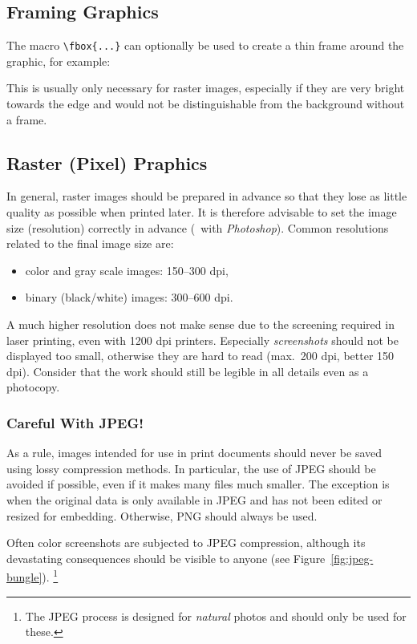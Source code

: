 \subsection{Framing Graphics}

The macro \verb!\fbox{...}! can optionally be used to create a thin frame
around the graphic, for example:
%
\begin{GenericCode}[numbers=none]
\end{GenericCode}
%
This is usually only necessary for raster images, especially if they are very
bright towards the edge and would not be distinguishable from the background
without a frame.

\subsection{Raster (Pixel) Praphics}

In general, raster images should be prepared in advance so that they lose as
little quality as possible when printed later. It is therefore advisable to
set the image size (resolution) correctly in advance (\eg\ with
\emph{Photoshop}). Common resolutions related to the final image size are:
%
\begin{itemize}
    \item color and gray scale images: 150--300 dpi,
    \item binary (black/white) images: 300--600 dpi.
\end{itemize}
%
A much higher resolution does not make sense due to the screening required in
laser printing, even with 1200 dpi printers. Especially \emph{screen\-shots}
should not be displayed too small, otherwise they are hard to read (max.\ 200
dpi, better 150 dpi). Consider that the work should still be legible in all
details even as a photocopy.

\subsubsection{Careful With JPEG!}

As a rule, images intended for use in print documents should never be saved
using lossy compression methods. In particular, the use of JPEG should be
avoided if possible, even if it makes many files much smaller. The exception
is when the original data is only available in JPEG and has not been edited
or resized for embedding. Otherwise, PNG should always be used.

Often color screenshots are subjected to JPEG compression, although its
devastating consequences should be visible to anyone (see
Figure~\ref{fig:jpeg-bungle}).%
\footnote{The JPEG process is designed for \emph{natural} photos and should
only be used for these.}

